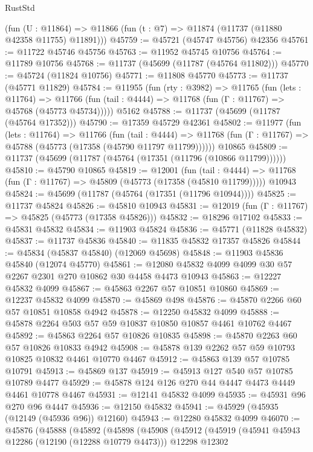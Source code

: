 \begin{lexlean}{RustStd}
\begin{coremodule}
    (fun (U : @11864) => @11866 (fun (t : @7) => @11874 (@11737 (@11880 @42358 @11755) @11891)))
@45759 := @45721 (@45747 @45756) @42356
@45761 := @11722 @45746 @45756
@45763 := @11952 @45745 @10756
@45764 := @11789 @10756
@45768 := @11737 (@45699 (@11787 (@45764 @11802)))
@45770 := @45724 (@11824 @10756)
@45771 := @11808 @45770
@45773 := @11737 (@45771 @11829)
@45784 := @11955
    (fun (rty : @3982) =>
    @11765
      (fun (lets : @11764) =>
      @11766 (fun (tail : @4444) => @11768 (fun (Γ : @11767) => @45768 (@45773 @45734)))))
    @5162
@45788 := @11737 (@45699 (@11787 (@45764 @17352)))
@45790 := @17359 @45729 @42361
@45802 := @11977
    (fun (lets : @11764) =>
    @11766
      (fun (tail : @4444) =>
      @11768 (fun (Γ : @11767) => @45788 (@45773 (@17358 (@45790 @11797 @11799))))))
    @10865
@45809 := @11737 (@45699 (@11787 (@45764 (@17351 (@11796 (@10866 @11799))))))
@45810 := @45790 @10865
@45819 := @12001
    (fun (tail : @4444) => @11768 (fun (Γ : @11767) => @45809 (@45773 (@17358 (@45810 @11799)))))
    @10943
@45824 := @45699 (@11787 (@45764 (@17351 (@11796 @10944))))
@45825 := @11737 @45824
@45826 := @45810 @10943
@45831 := @12019 (fun (Γ : @11767) => @45825 (@45773 (@17358 @45826)))
@45832 := @18296 @17102
@45833 := @45831 @45832
@45834 := @11903 @45824
@45836 := @45771 (@11828 @45832)
@45837 := @11737 @45836
@45840 := @11835 @45832 @17357 @45826
@45844 := @45834 (@45837 @45840) (@12069 @45698)
@45848 := @11903 @45836 @45840 (@12074 @45770)
@45861 := @12080 @45832 @4099 @4099 @30 @57 @2267 @2301 @270 @10862 @30 @4458 @4473 @10943
@45863 := @12227 @45832 @4099
@45867 := @45863 @2267 @57 @10851 @10860
@45869 := @12237 @45832 @4099
@45870 := @45869 @498
@45876 := @45870 @2266 @60 @57 @10851 @10858 @4942
@45878 := @12250 @45832 @4099
@45888 := @45878 @2264 @503 @57 @59 @10837 @10850 @10857 @4461 @10762 @4467
@45892 := @45863 @2264 @57 @10826 @10835
@45898 := @45870 @2263 @60 @57 @10826 @10833 @4942
@45908 := @45878 @139 @2262 @57 @59 @10793 @10825 @10832 @4461 @10770 @4467
@45912 := @45863 @139 @57 @10785 @10791
@45913 := @45869 @137
@45919 := @45913 @127 @540 @57 @10785 @10789 @4477
@45929 := @45878 @124 @126 @270 @44 @4447 @4473 @4449 @4461 @10778 @4467
@45931 := @12141 @45832 @4099
@45935 := @45931 @96 @270 @96 @4447
@45936 := @12150 @45832
@45941 := @45929 (@45935 (@12149 (@45936 @96)) @12160)
@45943 := @12280 @45832 @4099
@46070 := @45876
    (@45888
      (@45892
        (@45898
          (@45908
            (@45912
              (@45919
                (@45941 @45943 @12286 (@12190 (@12288 @10779 @4473)))
                @12298
                @12302

\end{coremodule}
\end{lexlean}
